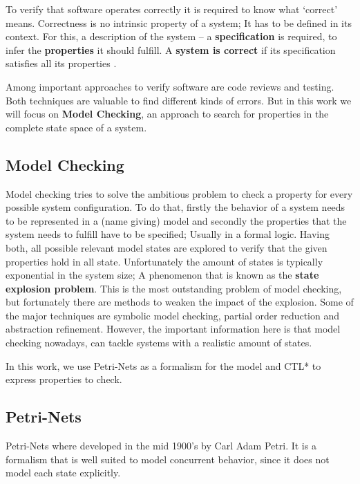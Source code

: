 To verify that software operates correctly it is required to know what `correct' means.
Correctness is no intrinsic property of a system;
It has to be defined in its context.
For this, a description of the system -- a \textbf{specification} is required, to infer the \textbf{properties} it should fulfill.
A \textbf{system is correct} if its specification satisfies all its properties \cite[Chapter 1]{baier2008principles}.

Among important approaches to verify software are code reviews and testing.
Both techniques are valuable to find different kinds of errors.
But in this work we will focus on \textbf{Model Checking}, an approach to search for properties in the complete state space of a system.

\subsection{Model Checking}
Model checking tries to solve the ambitious problem to check a property for every possible system configuration.
To do that, firstly the behavior of a system needs to be represented in a (name giving) model
and secondly the properties that the system needs to fulfill have to be specified;
Usually in a formal logic.
Having both, all possible relevant model states are explored to verify that the given properties hold in all state.
Unfortunately the amount of states is typically exponential in the system size;
A phenomenon that is known as the \textbf{state explosion problem}\cite[Introduction]{mcmillan1993symbolic}.
This is the most outstanding problem of model checking, but fortunately there are methods to weaken the impact of the explosion.
Some of the major techniques are symbolic model checking, partial order reduction and abstraction refinement\cite[Chapter 5]{clarke2011model}.
However, the important information here is that model checking nowadays, can tackle systems with a realistic amount of states.

In this work, we use Petri-Nets as a formalism for the model and CTL* to express properties to check.

\subsection{Petri-Nets}
\label{rel_petri}
Petri-Nets where developed in the mid 1900's by Carl Adam Petri\cite{petri1962kommunikation}.
It is a formalism that is well suited to model concurrent behavior, since it does not model each state explicitly.

